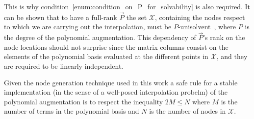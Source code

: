 This is why condition~\ref{enum:condition_on_P_for_solvability} is also required. It can be shown that to have a full-rank $\vec{P}$ the set $\mathcal{X}$, containing the nodes respect to which we are carrying out the interpolation, must be $P$-unisolvent~\cite{Fasshauer:details_on_basic_functions}, where $P$ is the degree of the polynomial augmentation. This dependency of $\vec{P}$'s rank on the node locations should not surprise since the matrix columns consist on the elements of the polynomial basis evaluated at the different points in $\mathcal{X}$, and they are required to be linearly independent.

Given the node generation technique used in this work a safe rule for a stable implementation (in the sense of a well-posed interpolation probelm) of the polynomial augmentation is to respect the inequality $2M \le N$ where $M$ is the number of terms in the polynomial basis and $N$ is the number of nodes in $\mathcal{X}$.






































